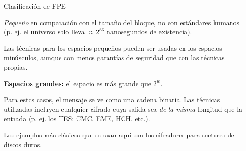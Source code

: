\begin{frame}{Clasificación de FPE}
  {
    \textit{Pequeño} en comparación con el tamaño del bloque, no con
    estándares humanos (p. ej. el universo solo lleva $ \approx 2^{86}$
    nanosegundos de existencia).

    Las técnicas para los espacios pequeños pueden ser usadas en los
    espacios minúsculos, aunque con menos garantías de seguridad que con
    las técnicas propias.
  }

  {
    \textbf{Espacios grandes:} el espacio es más grande que $ 2^w $.

    Para estos casos, el mensaje se ve como una cadena binaria. Las técnicas
    utilizadas incluyen cualquier cifrado cuya salida sea \textit{de la misma}
    longitud que la entrada (p. ej. los TES: CMC, EME, HCH, etc.).
  }

  {
    Los ejemplos más clásicos que se usan aquí son los cifradores para sectores
    de discos duros.
  }

\end{frame}
